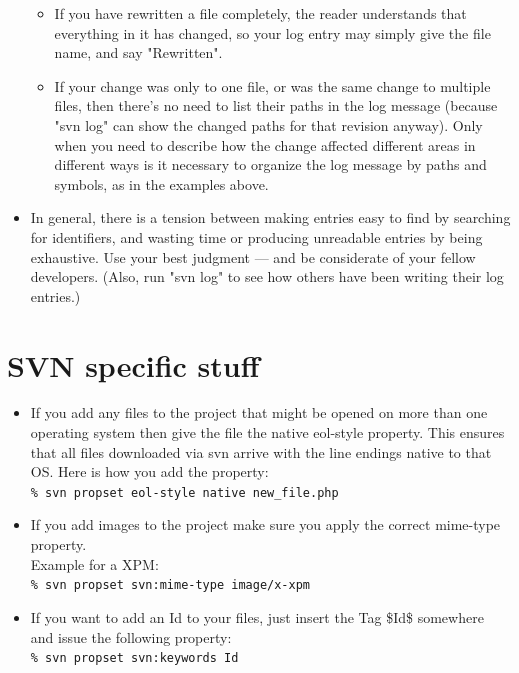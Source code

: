 \documentclass[headexclude,footexclude,12pt,BCOR0pt,DIV15]{scrartcl}
\begin{document}
\begin{itemize}
\begin{itemize}
        \item If you have rewritten a file completely, the reader understands
          that everything in it has changed, so your log entry may simply
          give the file name, and say "Rewritten".

        \item If your change was only to one file, or was the same change to
          multiple files, then there's no need to list their paths in the
          log message (because "svn log" can show the changed paths for
          that revision anyway).  Only when you need to describe how the
          change affected different areas in different ways is it
          necessary to organize the log message by paths and symbols, as
          in the examples above.
        \end{itemize}

    \item In general, there is a tension between making entries easy to find by
        searching for identifiers, and wasting time or producing unreadable
        entries by being exhaustive.  Use your best judgment --- and be
        considerate of your fellow developers.  (Also, run "svn log" to see
        how others have been writing their log entries.)
    \end{itemize}

\section{SVN specific stuff}
    \begin{itemize}
        \item If you add any files to the project that might be opened on more than one operating system then give the file
            the native eol-style property.  This ensures that all files downloaded via svn arrive with the line endings
            native to that OS.  Here is how you add the property:\\
            \texttt{\% svn propset eol-style native new\_file.php}

        \item If you add images to the project make sure you apply the correct  mime-type property.\\
            Example for a XPM:\\
            \texttt{\% svn propset svn:mime-type image/x-xpm}

        \item If you want to add an Id to your files, just insert the Tag \$Id\$ somewhere and issue the following property:\\
            \texttt{\% svn propset svn:keywords Id}

    \end{itemize}
\end{document}

